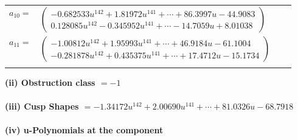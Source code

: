 \documentclass[1p]{elsarticle_modified}
\theoremstyle{definition}
\begin{document}
\begin{tabular}{m{7pt} m{180pt} m{7pt} m{180pt} }
\flushright $a_{10}=$&$\begin{pmatrix}-0.682533 u^{142}+1.81972 u^{141}+\cdots+86.3997 u-44.9083\\0.128085 u^{142}-0.345952 u^{141}+\cdots-14.7059 u+8.01038\end{pmatrix}$ \\
\flushright $a_{11}=$&$\begin{pmatrix}-1.00812 u^{142}+1.95993 u^{141}+\cdots+46.9184 u-61.1004\\-0.281878 u^{142}+0.435375 u^{141}+\cdots+17.4712 u-15.1734\end{pmatrix}$\\&\end{tabular}
\flushleft \textbf{(ii) Obstruction class $= -1$}\\~\\
\flushleft \textbf{(iii) Cusp Shapes $= -1.34172 u^{142}+2.00690 u^{141}+\cdots+81.0326 u-68.7918$}\\~\\
\newpage\renewcommand{\arraystretch}{1}
\flushleft \textbf{(iv) u-Polynomials at the component}\newline \\
\end{document}
